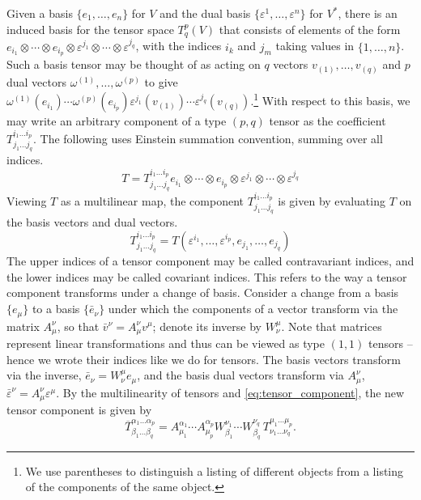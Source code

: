 \documentclass[a4paper,12pt]{article}
\begin{document}
Given a basis $\{e_1, \ldots, e_n\}$ for $V$ and the dual basis $\{\varepsilon^1, \ldots, \varepsilon^n\}$ for $V^*$, there is an induced basis for the tensor space $T^p_q(V)$ that consists of elements of the form $e_{i_1} \otimes \cdots \otimes e_{i_p} \otimes \varepsilon^{j_1} \otimes \cdots \otimes \varepsilon^{j_q}$, with the indices $i_k$ and $j_m$ taking values in $\{1, \ldots, n\}$.
Such a basis tensor may be thought of as acting on $q$ vectors $v_{(1)}, \ldots, v_{(q)}$ and $p$ dual vectors $\omega^{(1)}, \ldots, \omega^{(p)}$ to give $\omega^{(1)}(e_{i_1}) \cdots \omega^{(p)}(e_{i_p}) \varepsilon^{j_1} (v_{(1)}) \cdots \varepsilon^{j_q}(v_{(q)})$.\footnote{We use parentheses to distinguish a listing of different objects from a listing of the components of the same object.}
With respect to this basis, we may write an arbitrary component of a type $(p, q)$ tensor as the coefficient $T^{i_1 \ldots i_p}_{j_1 \ldots j_q}$.
The following uses Einstein summation convention, summing over all indices.
\begin{equation}
    T = T^{i_1 \ldots i_p}_{j_1 \ldots j_q} e_{i_1} \otimes \cdots \otimes e_{i_p} \otimes \varepsilon^{j_1} \otimes \cdots \otimes \varepsilon^{j_q}
\end{equation}
Viewing $T$ as a multilinear map, the component $T^{i_1 \ldots i_p}_{j_1 \ldots j_q}$ is given by evaluating $T$ on the basis vectors and dual vectors.
\begin{equation}\label{eq:tensor_component}
    T^{i_1 \ldots i_p}_{j_1 \ldots j_q} = T(\varepsilon^{i_1}, \ldots, \varepsilon^{i_p}, e_{j_1}, \ldots, e_{j_q})
\end{equation}
The upper indices of a tensor component may be called contravariant indices, and the lower indices may be called covariant indices.
This refers to the way a tensor component transforms under a change of basis.
Consider a change from a basis $\{e_\mu\}$ to a basis $\{\bar{e}_\nu\}$ under which the components of a vector transform via the matrix $A^\nu_\mu$, so that $\bar{v}^\nu = A^\nu_\mu v^\mu$; denote its inverse by $W^\mu_\nu$.
Note that matrices represent linear transformations and thus can be viewed as type $(1, 1)$ tensors -- hence we wrote their indices like we do for tensors.
The basis vectors transform via the inverse, $\bar{e}_\nu = W^\mu_\nu e_\mu$, and the basis dual vectors transform via $A^\nu_\mu$, $\bar{\varepsilon}^\nu = A^\nu_\mu \varepsilon^\mu$.
By the multilinearity of tensors and \eqref{eq:tensor_component}, the new tensor component is given by
\begin{equation}
    \overbar{T}^{\alpha_1 \ldots \alpha_p}_{\beta_1 \ldots \beta_q}
    = A^{\alpha_1}_{\mu_1} \cdots A^{\alpha_p}_{\mu_p}
      W^{\nu_1}_{\beta_1} \cdots W^{\nu_q}_{\beta_q}
      \, T^{\mu_1 \ldots \mu_p}_{\nu_1 \ldots \nu_q}.
\end{equation}
\end{document}
